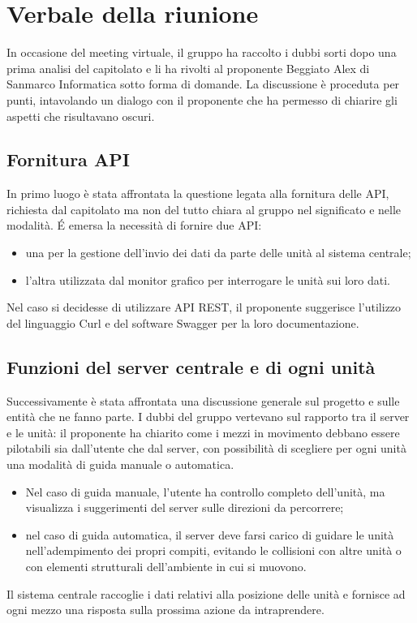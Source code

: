 \section{Verbale della riunione}

In occasione del meeting virtuale, il gruppo ha raccolto i dubbi sorti dopo una prima analisi del capitolato e li ha rivolti al proponente Beggiato Alex di Sanmarco Informatica sotto forma di domande. La discussione è proceduta per punti, intavolando un dialogo con il proponente che ha permesso di chiarire gli aspetti che risultavano oscuri.


\subsection{Fornitura API}
In primo luogo è stata affrontata la questione legata alla fornitura delle API, richiesta dal capitolato ma non del tutto chiara al gruppo nel significato e nelle modalità. \'E emersa la necessità di fornire due API:
\begin{itemize}
	\item una per la gestione dell'invio dei dati da parte delle unità al sistema centrale;
	\item l'altra utilizzata dal monitor grafico per interrogare le unità sui loro dati.
\end{itemize}
Nel caso si decidesse di utilizzare API REST, il proponente suggerisce l'utilizzo del linguaggio Curl e del software Swagger per la loro documentazione.

\subsection{Funzioni del server centrale e di ogni unità}
Successivamente è stata affrontata una discussione generale sul progetto e sulle entità che ne fanno parte. I dubbi del gruppo vertevano sul rapporto tra il server e le unità: il proponente ha chiarito come i mezzi in movimento debbano essere pilotabili sia dall'utente che dal server, con possibilità di scegliere per ogni unità una modalità di guida manuale o automatica. 
\begin{itemize}
	\item Nel caso di guida manuale, l'utente ha controllo completo dell'unità, ma visualizza i suggerimenti del server sulle direzioni da percorrere;
	\item nel caso di guida automatica, il server deve farsi carico di guidare le unità nell'adempimento dei propri compiti, evitando le collisioni con altre unità o con elementi strutturali dell'ambiente in cui si muovono.
\end{itemize}
 Il sistema centrale raccoglie i dati relativi alla posizione delle unità e fornisce ad ogni mezzo una risposta sulla prossima azione da intraprendere. 

